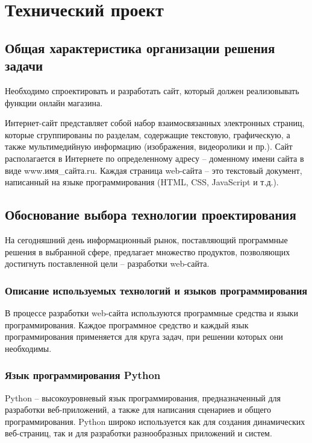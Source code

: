 \section{Технический проект}
\subsection{Общая характеристика организации решения задачи}

Необходимо спроектировать и разработать сайт, который должен реализовывать функции онлайн магазина.

Интернет-сайт представляет собой набор взаимосвязанных электронных страниц, которые сгруппированы по разделам, содержащие текстовую, графическую, а также мультимедийную информацию (изображения, видеоролики и пр.). Сайт располагается в Интернете по определенному адресу – доменному имени сайта в виде www.имя\_сайта.ru. Каждая страница web-сайта – это текстовый документ, написанный на языке программирования (HTML, CSS, JavaScript и т.д.).

\subsection{Обоснование выбора технологии проектирования}

На сегодняшний день информационный рынок, поставляющий программные решения в выбранной сфере, предлагает множество продуктов, позволяющих достигнуть поставленной цели – разработки web-сайта.

\subsubsection{Описание используемых технологий и языков программирования}

В процессе разработки web-сайта используются программные средства и языки программирования. Каждое программное средство и каждый язык программирования применяется для круга задач, при решении которых они необходимы.

\subsubsection{Язык программирования Python}

Python – высокоуровневый язык программирования, предназначенный для разработки веб-приложений, а также для написания сценариев и общего программирования. Python широко используется как для создания динамических веб-страниц, так и для разработки разнообразных приложений и систем.

